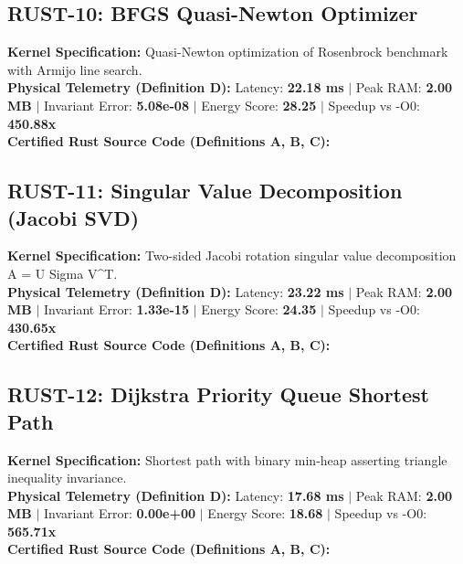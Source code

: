 \vspace{1em}
\subsection{RUST-10: BFGS Quasi-Newton Optimizer}
\textbf{Kernel Specification:} Quasi-Newton optimization of Rosenbrock benchmark with Armijo line search.\\
\textbf{Physical Telemetry (Definition D):} Latency: \textbf{22.18 ms} $|$ Peak RAM: \textbf{2.00 MB} $|$ Invariant Error: \textbf{5.08e-08} $|$ Energy Score: \textbf{28.25} $|$ Speedup vs -O0: \textbf{450.88x}\\

\textbf{Certified Rust Source Code (Definitions A, B, C):}


\vspace{1em}
\subsection{RUST-11: Singular Value Decomposition (Jacobi SVD)}
\textbf{Kernel Specification:} Two-sided Jacobi rotation singular value decomposition A = U Sigma V\textasciicircum{}T.\\
\textbf{Physical Telemetry (Definition D):} Latency: \textbf{23.22 ms} $|$ Peak RAM: \textbf{2.00 MB} $|$ Invariant Error: \textbf{1.33e-15} $|$ Energy Score: \textbf{24.35} $|$ Speedup vs -O0: \textbf{430.65x}\\

\textbf{Certified Rust Source Code (Definitions A, B, C):}


\vspace{1em}
\subsection{RUST-12: Dijkstra Priority Queue Shortest Path}
\textbf{Kernel Specification:} Shortest path with binary min-heap asserting triangle inequality invariance.\\
\textbf{Physical Telemetry (Definition D):} Latency: \textbf{17.68 ms} $|$ Peak RAM: \textbf{2.00 MB} $|$ Invariant Error: \textbf{0.00e+00} $|$ Energy Score: \textbf{18.68} $|$ Speedup vs -O0: \textbf{565.71x}\\

\textbf{Certified Rust Source Code (Definitions A, B, C):}


\vspace{1em}
